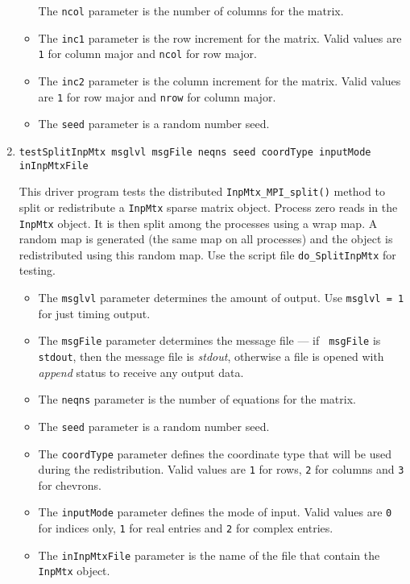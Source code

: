 \begin{enumerate}
\begin{itemize}
The {\tt ncol} parameter is the number of columns for the matrix.
\item
The {\tt inc1} parameter is the row increment  for the matrix.
Valid values are {\tt 1} for column major and {\tt ncol} for row
major.
\item
The {\tt inc2} parameter is the column increment  for the matrix.
Valid values are {\tt 1} for row major and {\tt nrow} for column
major.
\item
The {\tt seed} parameter is a random number seed.
\end{itemize}
\item
\begin{verbatim}
testSplitInpMtx msglvl msgFile neqns seed coordType inputMode inInpMtxFile
\end{verbatim}
This driver program tests the distributed {\tt InpMtx\_MPI\_split()}
method to split or redistribute a {\tt InpMtx} sparse matrix object.
Process zero reads in the {\tt InpMtx} object.
It is then split among the processes using a wrap map.
A random map is generated (the same map on all processes) and the
object is redistributed using this random map.
Use the script file {\tt do\_SplitInpMtx} for testing.
\par
\begin{itemize}
\item
The {\tt msglvl} parameter determines the amount of output.
Use {\tt msglvl = 1} for just timing output.
\item
The {\tt msgFile} parameter determines the message file --- if {\tt
msgFile} is {\tt stdout}, then the message file is {\it stdout},
otherwise a file is opened with {\it append} status to receive any
output data.
\item
The {\tt neqns} parameter is the number of equations for the matrix.
\item
The {\tt seed} parameter is a random number seed.
\item
The {\tt coordType} parameter defines the coordinate type that will
be used during the redistribution. Valid values are {\tt 1} for rows,
{\tt 2} for columns and {\tt 3} for chevrons.
\item
The {\tt inputMode} parameter defines the mode of input.
Valid values are {\tt 0} for indices only,
{\tt 1} for real entries 
and {\tt 2} for complex entries.
\item
The {\tt inInpMtxFile} parameter is the name of the file that
contain the {\tt InpMtx} object.
\end{itemize}

\end{enumerate}
